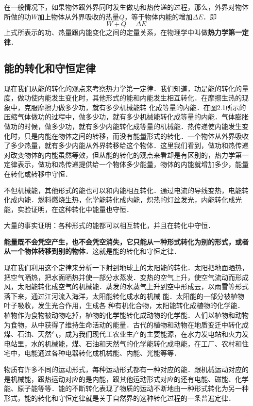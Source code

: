 在一般情况下，如果物体跟外界同时发生做功和热传递的过程，那么，外界对物体所做的功$W$加上物体从外界吸收的热量$Q$，等于物体内能的增加$\Delta E$．即
\[W+Q=\Delta E\]
上式所表示的功、热量跟内能变化之间的定量关系，在物理学中叫做\textbf{热力学第一定律}．

\subsection{能的转化和守恒定律} 
现在我们从能的转化的观点来考察热力学第一定律．我们知道，功是能的转化的量度，做功使内能发生变化时，其他形式的能和内能发生相互转化．在摩擦生热的现象中，克服摩擦力做多少功，就有多少机械能转
化成等量的内能．在图2.1所示的压缩气体做功的过程中，做多少功，就有多少机械能转化成等量的内能．气体膨胀做功的时候，做多少功，就有多少内能转化成等量的机械能．热传递使内能发生变化时，只是内能在物体之间的转移，而没有能量形式的转化．一个物体从外界吸收了多少热量，就有多少内能从外界转移给这个物体．这里我们看到，做功和热传递对改变物体的内能虽然等效，但从能的转化的观点来看却是有区别的，热力学第一定律表示，做功和热传递提供给一个物体多少能量，物体的内能就增加多少，能量在转化或转移中守恒．

不但机械能，其他形式的能也可以和内能相互转化．通过电流的导线变热，电能转化成内能．燃料燃烧生热，化学能转化成内能，炽热的灯丝发光，内能转化成光能，实验证明，在这种转化中能量也守恒．

大量的事实证明：各种形式的能都可以相互转化，并且在转化中守恒．


\textbf{能量既不会凭空产生，也不会凭空消失，它只能从一种形式转化为别的形式，或者从一个物体转移到别的物体．}这就是能的转化和守恒定律．

现在我们利用这个定律来分析一下射到地球上的太阳能的转化．太阳把地面晒热，把空气晒热，把水面晒热并使一部分水蒸发．变热的空气上升，使空气流动而形成风，太阳能转化成空气的机械能．蒸发的水蒸气上升到空中形成云，以雨雪等形式落下来，通过江河流入海洋，太阳能转化成水的机械
能．太阳能的一部分被植物叶子吸收，发生光合作用，生成各
种有机化合物，太阳能转化成植物的化学能．植物作为食物被动物吃掉，植物的化学能转化成动物的化学能．人们以植物和动物为食物，从中获得了维持生命活动的能量．古代的植物和动物在地质变迁中转化成煤、石油、天然气，成为我们现代工农业生产的主要能源，在水力发电站和火力发电站里，水的机械能，煤、石油和天然气的化学能转化成电能，在工厂、农村和住宅中，电能通过各种电器转化成机械能、内能、光能等等．

物质有许多不同的运动形式，每种运动形式都有一种对应的能．跟机械运动对应的是机械能，跟热运动对应的是内能，跟其他运动形式对应的还有电能、磁能、化学能、原子能等等．能的不断转化表现了物质的运动不断地由一种形式转化为另一种形式，能的转化和守恒定律就是关于自然界的这种转化过程的一条普遍定律．

